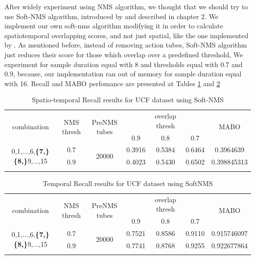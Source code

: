 \documentclass{report}
\begin{document}
After widely experiment using NMS algorithm, we thought that we should try to use Soft-NMS algorithm, introduced by \cite{DBLP:journals/corr/BodlaSCD17} and described in chapter 2. We implement our own soft-nms algorithm modifying it in order to calculate spatiotemporal overlapping
scores, and not just spatial, like the one implemented by \cite{DBLP:journals/corr/BodlaSCD17}. As mentioned before, instead of removing action tubes, Soft-NMS algorithm just reduces their score for those which overlap over a predefined threshold, We experiment for sample duration
equal with 8 and thresholds equal with 0.7 and 0.9, because, our implementation ran out of memory for sample duration equal with 16.
Recall and MABO perfomance are presented at Tables \ref{table:ucf_softnms_recall} and \ref{table:ucf_softnms_temp_recall}

\begin{center}
  \setlength{\tabcolsep}{2pt}
\begin{longtable}{||c | c | c | c c c| c|}

  \hline
  \multirow{2}{*}{combination} & \multirow{2}{2.5em}{NMS thresh} & \multirow{2}{3.5em}{PreNMS tubes} &  {} &overlap thresh & {} & \multirow{2}{*}{MABO} \\
  {} & {} & {} &  0.9 &  0.8 & 0.7 & {}\\         
  \hline
  \multirow{2}{7em}{0,1,...,6,\textbf{\{7,\}}
  \textbf{\{8,\}}9,...,15 }  & 0.7 &\multirow{2}{*}{20000}  & 0.3916 & 0.5384 & 0.6464 & 0.3964639 \\
  \cline{2-2} \cline{4-7} 
  {} &  0.9   & {}   & 0.4023 & 0.5430 & 0.6502 & 0.398845313 \\
  \hline                                    

  \caption{Spatio-temporal Recall results for UCF dataset using Soft-NMS}
  \label{table:ucf_softnms_recall}
\end{longtable} 
\end{center}

\begin{center}
  \setlength{\tabcolsep}{2.2pt}
\begin{longtable}{||c | c | c | c c c| c|}

  \hline
  \multirow{2}{*}{combination} & \multirow{2}{2.5em}{NMS thresh} & \multirow{2}{3.5em}{PreNMS tubes} &  {} &overlap thresh & {} & \multirow{2}{*}{MABO} \\
  {} & {} & {} &  0.9 &  0.8 & 0.7 & {}\\         
  \hline

  \multirow{2}{7em}{0,1,...,6,\textbf{\{7,\}}
    \textbf{\{8,\}}9,...,15 }  & 0.7 &\multirow{2}{*}{20000}  & 0.7521 & 0.8586 & 0.9110 & 0.915746097  \\
  \cline{2-2} \cline{4-7} 
  {} &  0.9   & {}   & 0.7741 & 0.8768 & 0.9255 & 0.922677864 \\
  \hline                                    

  \caption{Temporal Recall results for UCF dataset using SoftNMS}
  \label{table:ucf_softnms_temp_recall}
\end{longtable} 
\end{center}
\end{document}
